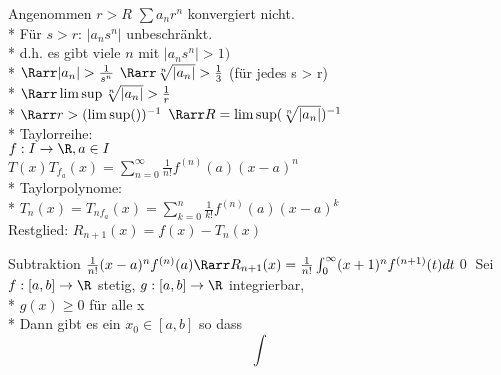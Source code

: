 \item Angenommen $r>R$ \Rarr $\sum a_n r^n$ konvergiert nicht.\\*
\Rarr Für $s>r$: $|a_n s^n|$ unbeschränkt.\\*
d.h. es gibt viele $n$ mit $|a_n s^n| > 1)$\\*
$\Rarr |a_n| > \frac{1}{s^n}$ $\Rarr \sqrt[n]{|a_n|} > \frac{1}{3}$ (für jedes s > r)\\*
$\Rarr \limsup \sqrt[n]{|a_n|} > \frac{1}{r}$\\*
$\Rarr r > (\limsup () )^{-1}$
$\Rarr R = \limsup (\sqrt[n]{|a_n|})^{-1}$\\*
Taylorreihe:\\
$f: I \to \R, a \in I$\\
$T(x) T_{f_a}(x) = \sum_{n=0}^{\infty} \frac{1}{n!} f^{(n)} (a) (x-a)^n$\\*
Taylorpolynome:\\*
$T_n(x) = T_{nf_a}(x) = \sum_{k=0}^n \frac{1}{k!}f^{(n)}(a) (x-a)^k$\\
Restglied: $R_{n+1} (x) = f(x) - T_n(x)$

Subtraktion $\frac{1}{n!} (x-a)^n f^{(n)} (a) \Rarr R_{n+1} (x) = \frac{1}{n!} \int_0^{\infty} (x+1)^n f^{(n+1)}(t) dt$\qed
{}
Sei $f: [a, b] \to \R$ stetig, $g: [a, b] \to \R$ integrierbar,\\*
$g(x) \geq 0$ für alle x\\*
Dann gibt es ein $x_0 \in [a, b]$ so dass 
$$\int $$ %

